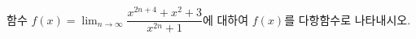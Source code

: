 함수 $f(x)=\displaystyle\lim_{n\to\infty}\dfrac{x^{2n+4}+x^2+3}{x^{2n}+1}$에 대하여 $f(x)$를 다항함수로 나타내시오. 
